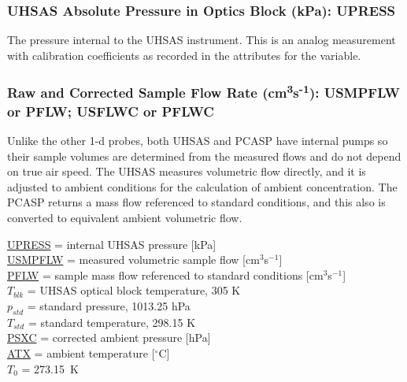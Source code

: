 \documentclass[
]{book}
\begin{document}
\hypertarget{upress}{%
\subsubsection*{UHSAS Absolute Pressure in Optics Block (kPa): UPRESS}\label{upress}}

The pressure internal to the UHSAS instrument. This is an analog measurement with calibration coefficients as recorded in the attributes for the variable.

\hypertarget{pflw}{%
\subsubsection*{\texorpdfstring{Raw and Corrected Sample Flow Rate (cm\textsuperscript{3}s\textsuperscript{-1}): USMPFLW or PFLW; USFLWC or PFLWC}{Raw and Corrected Sample Flow Rate (cm3s-1): USMPFLW or PFLW; USFLWC or PFLWC}}\label{pflw}}

Unlike the other 1-d probes, both UHSAS and PCASP have internal pumps so their sample volumes are determined from the measured flows and do not depend on true air speed. The UHSAS measures volumetric flow directly, and it is adjusted to ambient conditions for the calculation of ambient concentration. The PCASP returns a mass flow referenced to standard conditions, and this also is converted to equivalent ambient volumetric flow.

\protect\hyperlink{upress}{UPRESS} = internal UHSAS pressure {[}kPa{]}\\
\protect\hyperlink{pflw}{USMPFLW} = measured volumetric sample flow {[}cm\(^{3}\)s\(^{-1}\){]}\\
\protect\hyperlink{pflw}{PFLW} = sample mass flow referenced to standard conditions {[}cm\(^{3}\)s\(^{-1}\){]}\\
\(T_{blk}\) = UHSAS optical block temperature, 305 K\\
\(p_{std}\) = standard pressure, 1013.25 hPa\\
\(T_{std}\) = standard temperature, 298.15 K\\
\href{./4-the-state-of-the-atmosphere.html\#psx}{PSXC} = corrected ambient pressure {[}hPa{]}\\
\href{./4-the-state-of-the-atmosphere.html\#ambient-t}{ATX} = ambient temperature {[}\(^{\circ}\)C{]}\\
\(T_{0}\) = 273.15~K
\end{document}

